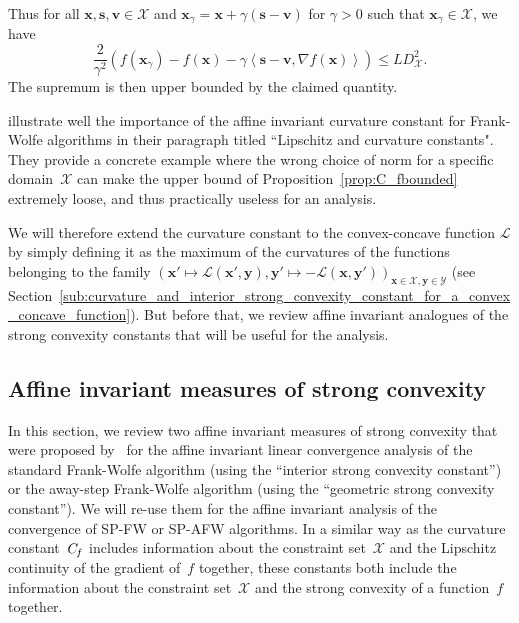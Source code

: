 \documentclass[twoside]{article}
\renewcommand{\L}{\mathcal{L}}
\newcommand{\X}{\mathcal{X}}
\newcommand{\Y}{\mathcal{Y}}
\newcommand{\prodscal}[2]{\left\langle#1,#2\right\rangle}
\newcommand{\x}{\bm{x}}
\newcommand{\y}{\bm{y}}
\newcommand{\s}{\bm{s}}
\newcommand{\stepsize}{\gamma}
\newcommand{\Cf}{C_{\hspace{-0.08em}f}}
\newcommand{\vv}{\bm{v}} %
\newcommand{\0}{\mathbf{0}} %
\begin{document}
  Thus for all $\x,\s,\vv \in \X$ and $\x_{\stepsize} = \x + \stepsize (\s - \vv)$ for $\stepsize > 0$ such that $\x_{\stepsize} \in \X$, we have
  \begin{equation}
    \frac{2}{\gamma^2}( f(\x_{\stepsize})-f(\x)- \stepsize \prodscal{\s - \vv}{ \nabla f(\x)}) \leq L D_\X^2 .
  \end{equation}
  The supremum is then upper bounded by the claimed quantity. 
  \endproof
  
   illustrate well the importance of the affine invariant curvature constant for Frank-Wolfe algorithms in their paragraph titled ``Lipschitz and curvature constants". They provide a concrete example where the wrong choice of norm for a specific domain~$\X$ can make the upper bound of Proposition~\ref{prop:C_fbounded} extremely loose, and thus practically useless for an analysis.
  
  We will therefore extend the curvature constant to the convex-concave
    function $\L$ by simply defining it as the maximum of the curvatures of the functions
    belonging to the family $\left(\x' \mapsto \L(\x',\y),\y' \mapsto
      -\L(\x,\y')\right)_{\x \in \X, \y \in \Y}$ (see Section~\ref{sub:curvature_and_interior_strong_convexity_constant_for_a_convex_concave_function}). But before that, we review affine invariant analogues of the strong convexity constants that will be useful for the analysis.






  \subsection{Affine invariant measures of strong convexity} %
  \label{sub:affine_invariant_measures_of_strong_convexity}

  In this section, we review two affine invariant measures of strong convexity that were proposed by~\citep{lacoste2015global} for the affine invariant linear convergence analysis of the standard Frank-Wolfe algorithm (using the ``interior strong convexity constant'') or the away-step Frank-Wolfe algorithm (using the ``geometric strong convexity constant''). We will re-use them for the affine invariant analysis of the convergence of SP-FW or SP-AFW algorithms. In a similar way as the curvature constant~$\Cf$ includes information about the constraint set~$\X$ and the Lipschitz continuity of the gradient of~$f$ together, these constants both include the information about the constraint set~$\X$ and the strong convexity of a function~$f$ together.
\end{document}
